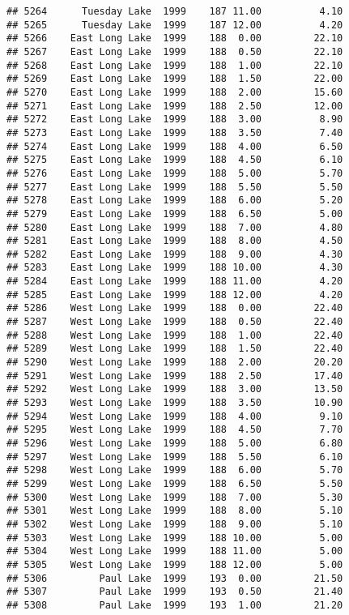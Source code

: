 \documentclass[
]{article}
\begin{document}
\begin{verbatim}
## 5264      Tuesday Lake  1999    187 11.00          4.10
## 5265      Tuesday Lake  1999    187 12.00          4.20
## 5266    East Long Lake  1999    188  0.00         22.10
## 5267    East Long Lake  1999    188  0.50         22.10
## 5268    East Long Lake  1999    188  1.00         22.10
## 5269    East Long Lake  1999    188  1.50         22.00
## 5270    East Long Lake  1999    188  2.00         15.60
## 5271    East Long Lake  1999    188  2.50         12.00
## 5272    East Long Lake  1999    188  3.00          8.90
## 5273    East Long Lake  1999    188  3.50          7.40
## 5274    East Long Lake  1999    188  4.00          6.50
## 5275    East Long Lake  1999    188  4.50          6.10
## 5276    East Long Lake  1999    188  5.00          5.70
## 5277    East Long Lake  1999    188  5.50          5.50
## 5278    East Long Lake  1999    188  6.00          5.20
## 5279    East Long Lake  1999    188  6.50          5.00
## 5280    East Long Lake  1999    188  7.00          4.80
## 5281    East Long Lake  1999    188  8.00          4.50
## 5282    East Long Lake  1999    188  9.00          4.30
## 5283    East Long Lake  1999    188 10.00          4.30
## 5284    East Long Lake  1999    188 11.00          4.20
## 5285    East Long Lake  1999    188 12.00          4.20
## 5286    West Long Lake  1999    188  0.00         22.40
## 5287    West Long Lake  1999    188  0.50         22.40
## 5288    West Long Lake  1999    188  1.00         22.40
## 5289    West Long Lake  1999    188  1.50         22.40
## 5290    West Long Lake  1999    188  2.00         20.20
## 5291    West Long Lake  1999    188  2.50         17.40
## 5292    West Long Lake  1999    188  3.00         13.50
## 5293    West Long Lake  1999    188  3.50         10.90
## 5294    West Long Lake  1999    188  4.00          9.10
## 5295    West Long Lake  1999    188  4.50          7.70
## 5296    West Long Lake  1999    188  5.00          6.80
## 5297    West Long Lake  1999    188  5.50          6.10
## 5298    West Long Lake  1999    188  6.00          5.70
## 5299    West Long Lake  1999    188  6.50          5.50
## 5300    West Long Lake  1999    188  7.00          5.30
## 5301    West Long Lake  1999    188  8.00          5.10
## 5302    West Long Lake  1999    188  9.00          5.10
## 5303    West Long Lake  1999    188 10.00          5.00
## 5304    West Long Lake  1999    188 11.00          5.00
## 5305    West Long Lake  1999    188 12.00          5.00
## 5306         Paul Lake  1999    193  0.00         21.50
## 5307         Paul Lake  1999    193  0.50         21.40
## 5308         Paul Lake  1999    193  1.00         21.20

\end{verbatim}
\end{document}
